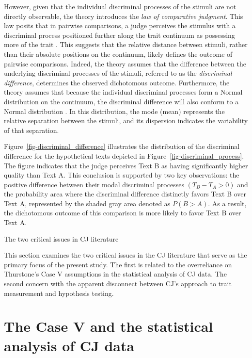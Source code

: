 \documentclass[
  authoryear,
  review,
  1p]{elsarticle}
\begin{document}
However, given that the individual discriminal processes of the stimuli
are not directly observable, the theory introduces the \emph{law of
comparative judgment}. This law posits that in pairwise comparisons, a
judge perceives the stimulus with a discriminal process positioned
further along the trait continuum as possessing more of the trait
\citep[pp.~251]{Bramley_2008}. This suggests that the relative distance
between stimuli, rather than their absolute positions on the continuum,
likely defines the outcome of pairwise comparisons. Indeed, the theory
assumes that the difference between the underlying discriminal processes
of the stimuli, referred to as the \emph{discriminal difference},
determines the observed dichotomous outcome. Furthermore, the theory
assumes that because the individual discriminal processes form a Normal
distribution on the continuum, the discriminal difference will also
conform to a Normal distribution \citep{Andrich_1978}. In this
distribution, the mode (mean) represents the relative separation between
the stimuli, and its dispersion indicates the variability of that
separation.

Figure~\ref{fig-discriminal_difference} illustrates the distribution of
the discriminal difference for the hypothetical texts depicted in
Figure~\ref{fig-discriminal_process}. The figure indicates that the
judge perceives Text B as having significantly higher quality than Text
A. This conclusion is supported by two key observations: the positive
difference between their modal discriminal processes
\((T_{B} - T_{A} > 0)\) and the probability area where the discriminal
difference distinctly favors Text B over Text A, represented by the
shaded gray area denoted as \(P(B > A)\). As a result, the dichotomous
outcome of this comparison is more likely to favor Text B over Text A.

The two critical issues in CJ literature

This section examines the two critical issues in the CJ literature that
serve as the primary focus of the present study. The first is related to
the overreliance on Thurstone's Case V assumptions in the statistical
analysis of CJ data. The second concern with the apparent disconnect
between CJ's approach to trait measurement and hypothesis testing.

\section{The Case V and the statistical analysis of CJ
data}\label{sec-theory-issue1}
\end{document}
